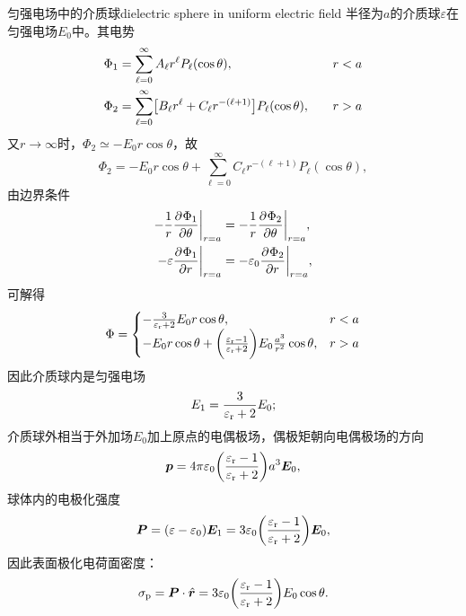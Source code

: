 \begin{example}{匀强电场中的介质球}{dielectric sphere in uniform electric field}
    半径为$a$的介质球$\varepsilon$在匀强电场$E_0$中。其电势
    \begin{alignat*}{2}
        \Phi_1 &= \sum_{\ell=0}^\infty A_\ell r^\ell P_\ell(\cos\theta),&\quad&r < a\\
        \Phi_2 &= \sum_{\ell=0}^\infty\bigl[B_\ell r^\ell + C_\ell r^{-(\ell+1)}\bigr]P_\ell(\cos\theta),&&r > a
    \end{alignat*}
    又$r \to \infty$时，$\Phi_2 \simeq -E_0r\cos\theta$，故
    \[
        \Phi_2 = -E_0r\cos\theta + \sum_{\ell=0}^\infty C_\ell r^{-(\ell+1)}P_\ell(\cos\theta),
    \]
    由边界条件
    \begin{align*}
        -{\frac1r\frac{\partial^{}\Phi_1}{\partial{\theta}^{}}}\biggr\rvert_{r=a} &= -{\frac1r\frac{\partial^{}\Phi_2}{\partial{\theta}^{}}}\biggr\rvert_{r=a},\\
        -\varepsilon{\frac{\partial^{}\Phi_1}{\partial{r}^{}}}\biggr\rvert_{r=a} &= -\varepsilon_0{\frac{\partial^{}\Phi_2}{\partial{r}^{}}}\biggr\rvert_{r=a},
    \end{align*}
    可解得
    \begin{equation}
        \label{eq:ed-dielectric-sphere-potential}
        \Phi = \begin{cases}
            -\frac{3}{\varepsilon_\mathrm r + 2}E_0r\cos\theta,&r < a\\
            -E_0r\cos\theta + \biggl(\frac{\varepsilon_\mathrm r - 1}{\varepsilon_\mathrm r + 2}\biggr)E_0\frac{a^3}{r^2}\cos\theta,&r > a
        \end{cases}
    \end{equation}
    因此介质球内是匀强电场
    \begin{equation}
        \label{eq:ed-dielectric-sphere-interior}
        E_1 = \frac{3}{\varepsilon_\mathrm r + 2}E_0;
    \end{equation}
    介质球外相当于外加场$E_0$加上原点的电偶极场，偶极矩朝向电偶极场的方向
    \begin{equation}
        \label{eq:ed-dielectric-sphere-dipole}
        \bm p = 4\pi\varepsilon_0\biggl(\frac{\varepsilon_\mathrm r - 1}{\varepsilon_\mathrm r + 2}\biggr)a^3\bm E_0,
    \end{equation}
    球体内的电极化强度
    \begin{equation}
        \label{eqn:P-E}
        \bm P = (\varepsilon - \varepsilon_0)\bm E_1 = 3\varepsilon_0\biggl(\frac{\varepsilon_\mathrm r - 1}{\varepsilon_\mathrm r + 2}\biggr)\bm E_0,
    \end{equation}
    因此表面极化电荷面密度：
    \begin{equation}
        \label{eq:ed-dielectric-sphere-bound-charge}
        \sigma_\mathrm p = \bm P \cdot \mathop{}\!\hat{\bm{r}} = 3\varepsilon_0\biggl(\frac{\varepsilon_\mathrm r - 1}{\varepsilon_\mathrm r + 2}\biggr)E_0\cos\theta.
    \end{equation}
\end{example}

